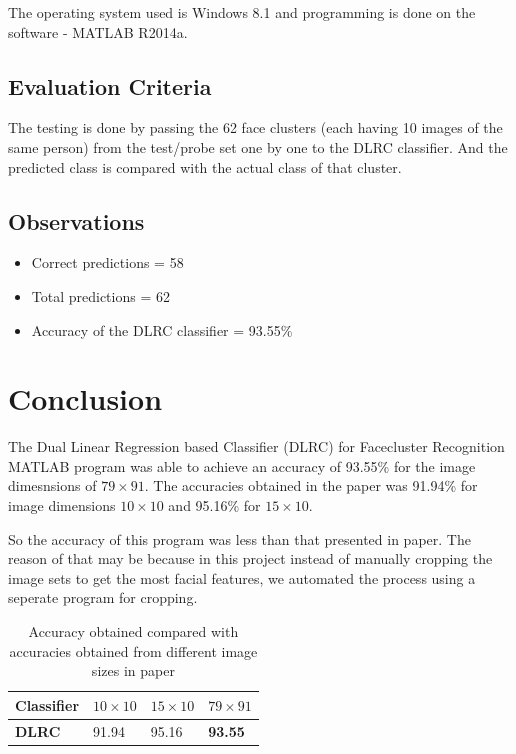 \documentclass[a4paper]{article}
\begin{document}
		The operating system used is Windows 8.1  and programming is done on the software - MATLAB R2014a. 
		
				
		
			
			
			\subsection{Evaluation Criteria}
			The testing is done by passing the 62 face clusters (each having 10 images of the same person) from the test/probe set one by one to the DLRC classifier. And the predicted class is compared with the actual class of that cluster.
			
			\subsection{Observations}
			
			\begin{itemize}
				\item Correct predictions = 	58
				
				\item Total predictions		= 	62
				
				\item Accuracy of the DLRC classifier	=	93.55\%
			\end{itemize}
	
	\section{Conclusion}
						
			The Dual Linear Regression based Classifier (DLRC) for Facecluster Recognition MATLAB program was able to achieve an accuracy of 93.55\% for the image dimesnsions of $79\times91$. The accuracies obtained in the paper was 91.94\% for image dimensions $10\times10$ and 95.16\% for $15\times10$. 
			
			So the accuracy of this program was less than that presented in paper. The reason of that may be because in this project instead of manually cropping the image sets to get the most facial features, we automated the process using a seperate program for cropping.
			\begin{table}[h!]
				\centering
				\caption{Accuracy obtained compared with accuracies obtained from different image sizes in paper}
				
				\begin{tabular}{|l|l|l|l|}
					\hline
					Classifier    & $10\times10$ & $15\times10$ & \textbf{$79\times91$} \\ \hline
					\textbf{DLRC} & 91.94 & 95.16 & \textbf{93.55} \\ \hline
				\end{tabular}
			\end{table}
			
\end{document}
